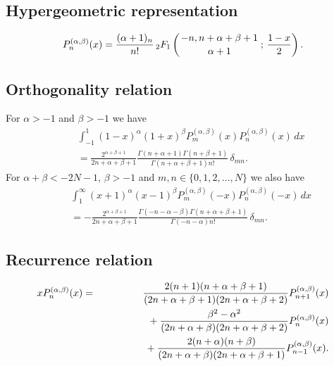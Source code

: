 \documentclass[envcountchap,graybox]{svmono}
\newcommand{\hyp}[5]{\mbox{}_{#1}{F}_{#2}
\left(\genfrac{}{}{0pt}{}{#3}{#4}\,;\,#5\right)}
\newcommand{\mathindent}{\hspace{7.5mm}}
\renewcommand{\Gamma}{\varGamma}
\begin{document}
\par\setcounter{equation}{0}

\subsection*{Hypergeometric representation}
\begin{equation}
\label{DefJacobi}
P_n^{(\alpha,\beta)}(x)=\frac{(\alpha+1)_n}{n!}\,
\hyp{2}{1}{-n,n+\alpha+\beta+1}{\alpha+1}{\frac{1-x}{2}}.
\end{equation}

\subsection*{Orthogonality relation}
For $\alpha>-1$ and $\beta>-1$ we have
\begin{eqnarray}
\label{OrtJacobi1}
& &\int_{-1}^1(1-x)^{\alpha}(1+x)^{\beta}P_m^{(\alpha,\beta)}(x)P_n^{(\alpha,\beta)}(x)\,dx\nonumber\\
& &{}=\frac{2^{\alpha+\beta+1}}{2n+\alpha+\beta+1}\frac{\Gamma(n+\alpha+1)\Gamma(n+\beta+1)}{\Gamma(n+\alpha+\beta+1)n!}\,\delta_{mn}.
\end{eqnarray}
For $\alpha+\beta<-2N-1$, $\beta>-1$ and $m,n\in\{0,1,2,\ldots,N\}$ we also have
\begin{eqnarray}
\label{OrtJacobi2}
& &\int_1^{\infty}(x+1)^{\alpha}(x-1)^{\beta}P_m^{(\alpha,\beta)}(-x)P_n^{(\alpha,\beta)}(-x)\,dx\nonumber\\
& &{}=-\frac{2^{\alpha+\beta+1}}{2n+\alpha+\beta+1}\frac{\Gamma(-n-\alpha-\beta)\Gamma(n+\alpha+\beta+1)}{\Gamma(-n-\alpha)n!}\,\delta_{mn}.
\end{eqnarray}

\subsection*{Recurrence relation}
\begin{eqnarray}
\label{RecJacobi}
xP_n^{(\alpha,\beta)}(x)&=&\frac{2(n+1)(n+\alpha+\beta+1)}{(2n+\alpha+\beta+1)(2n+\alpha+\beta+2)}P_{n+1}^{(\alpha,\beta)}(x)\nonumber\\
& &{}\mathindent{}+\frac{\beta^2-\alpha^2}{(2n+\alpha+\beta)(2n+\alpha+\beta+2)}P_n^{(\alpha,\beta)}(x)\nonumber\\
& &{}\mathindent\mathindent{}+\frac{2(n+\alpha)(n+\beta)}{(2n+\alpha+\beta)(2n+\alpha+\beta+1)}P_{n-1}^{(\alpha,\beta)}(x).
\end{eqnarray}
\end{document}
